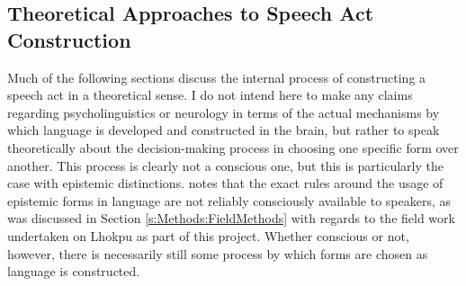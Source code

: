 \subsection{Theoretical Approaches to Speech Act Construction}\label{ss:Discussion:SpeechActs}
Much of the following sections discuss the internal process of constructing a speech act in a theoretical sense. I do not intend here to make any claims regarding psycholinguistics or neurology in terms of the actual mechanisms by which language is developed and constructed in the brain, but rather to speak theoretically about the decision-making process in choosing one specific form over another. This process is clearly not a conscious one, but this is particularly the case with epistemic distinctions.  notes that the exact rules around the usage of epistemic forms in language are not reliably consciously available to speakers, as was discussed in Section \ref{s:Methods:FieldMethods} with regards to the field work undertaken on Lhokpu as part of this project. Whether conscious or not, however, there is necessarily still some process by which forms are chosen as language is constructed.

